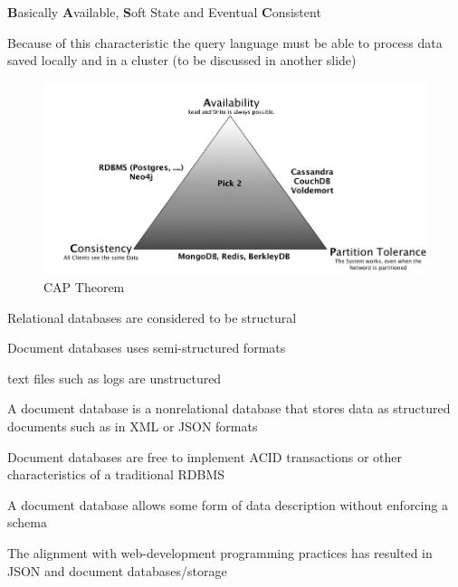 \documentclass{beamer}
\begin{document}
\begin{slide}{
\item \textbf{B}asically \textbf{A}vailable, \textbf{S}oft State
and  Eventual \textbf{C}onsistent \\
\item Because of this characteristic the query language must be able to process data saved locally and in a cluster (to be discussed in another slide)  
\begin{figure}
		\includegraphics[scale=0.25]{img/cap}
		\caption{CAP Theorem}
\end{figure}
}\end{slide}

\begin{slide}{
\item Relational databases are considered to be structural
\item Document databases uses semi-structured formats 
\item text files such as logs are unstructured
}\end{slide}


\begin{slide}{
\item A document database is a nonrelational database that stores data as structured documents such as in XML or JSON formats
\item Document databases are free to implement ACID transactions or other characteristics of a traditional RDBMS
\item A document database allows some form of data description without enforcing a schema
\item The alignment with web-development programming practices has resulted in JSON and document databases/storage
}\end{slide}	
\end{document}
